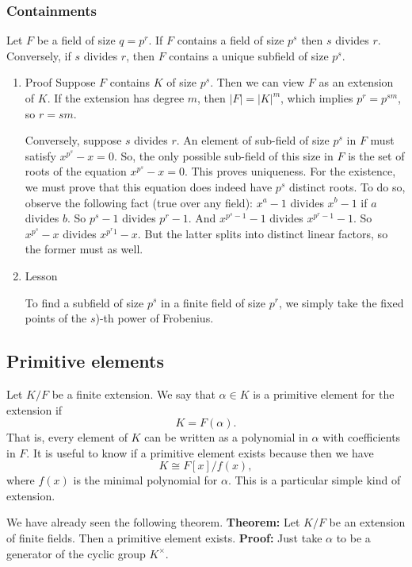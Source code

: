 \documentclass[11pt]{article}
\begin{document}
\subsubsection{Containments}
\label{sec:org0cf06a3}
Let \(F\) be a field of size \(q = p^{r}\).
If \(F\) contains a field of size \(p^{s}\) then \(s\) divides \(r\).
Conversely, if \(s\) divides \(r\), then \(F\) contains a unique subfield of size \(p^{s}\).
\begin{enumerate}
\item Proof
\label{sec:org785d39c}
Suppose \(F\) contains \(K\) of size \(p^{s}\).
Then we can view \(F\) as an extension of \(K\).
If the extension has degree \(m\), then \(|F| = |K|^m\), which implies \(p^r = p^{sm}\), so \(r = sm\).

Conversely, suppose \(s\) divides \(r\).
An element of sub-field of size \(p^s\) in \(F\) must satisfy \(x^{p^s}-x = 0\).
So, the only possible sub-field of this size in \(F\) is the set of roots of the equation \(x^{p^s}-x = 0\).
This proves uniqueness.
For the existence, we must prove that this equation does indeed have \(p^s\) distinct roots.
To do so, observe the following fact (true over any field): \(x^a-1\) divides \(x^{b}-1\) if \(a\) divides \(b\).
So \(p^{s}-1\) divides \(p^{r}-1\).
And \(x^{p^s-1}-1\) divides \(x^{p^r-1}-1\).
So \(x^{p^s}-x\) divides \(x^{p^r1}-x\).
But the latter splits into distinct linear factors, so the former must as well.
\item Lesson
\label{sec:org5e7328c}

To find a subfield of size \(p^{s}\) in a finite field of size \(p^r\), we simply take the fixed points of the \(s\))-th power of Frobenius.
\end{enumerate}
\subsection{Primitive elements}
\label{sec:org0729fb1}
Let \(K/F\) be a finite extension.
We say that \(\alpha \in K\) is a primitive element for the extension if
\[ K = F(\alpha).\]
That is, every element of \(K\) can be written as a polynomial in \(\alpha\) with coefficients in \(F\).
It is useful to know if a primitive element exists because then we have
\[ K \cong F[x]/f(x),\]
where \(f(x)\) is the minimal polynomial for \(\alpha\).
This is a particular simple kind of extension.

We have already seen the following theorem.
\textbf{\textbf{Theorem:}} Let \(K/F\) be an extension of finite fields.  Then a primitive element exists.
\textbf{\textbf{Proof:}} Just take \(\alpha\) to be a generator of the cyclic group \(K^{\times}\).
\end{document}
